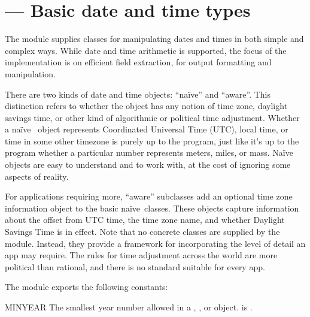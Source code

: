 \section{ ---
         Basic date and time types}


\newcommand{\Naive}{Na\"ive}
\newcommand{\naive}{na\"ive}

The  module supplies classes for manipulating dates
and times in both simple and complex ways.  While date and time
arithmetic is supported, the focus of the implementation is on
efficient field extraction, for output formatting and manipulation.

There are two kinds of date and time objects: ``\naive'' and ``aware''.
This distinction refers to whether the object has any notion of time
zone, daylight savings time, or other kind of algorithmic or political
time adjustment.  Whether a \naive\  object represents
Coordinated Universal Time (UTC), local time, or time in some other
timezone is purely up to the program, just like it's up to the program
whether a particular number represents meters, miles, or mass.  \Naive\
 objects are easy to understand and to work with, at
the cost of ignoring some aspects of reality.

For applications requiring more, ``aware''  subclasses add an
optional time zone information object to the basic \naive\ classes.
These \class{tzinfo} objects capture information about the offset from
UTC time, the time zone name, and whether Daylight Savings Time is in
effect.  Note that no concrete \class{tzinfo} classes are supplied by
the \module{datetime} module.  Instead, they provide a framework for
incorporating the level of detail an app may require.  The rules for
time adjustment across the world are more political than rational, and
there is no standard suitable for every app.

The  module exports the following constants:

\begin{datadesc}{MINYEAR}
  The smallest year number allowed in a ,
  , or  object.  
  is \code{1}.
\end{datadesc}

